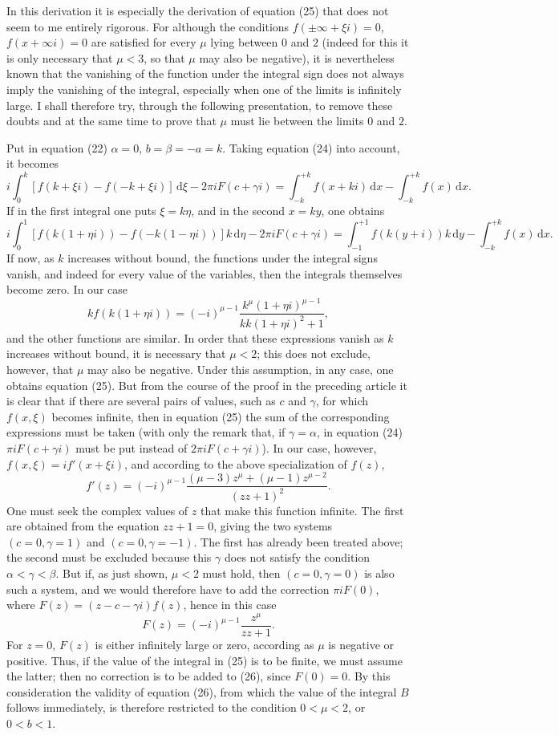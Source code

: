 \documentclass[11pt]{article}
\newcommand{\dd}{\,\mathrm d}
\begin{document}
In this derivation it is especially the derivation of equation (25) that does not seem to me entirely rigorous. For although the conditions $f(\pm\infty+\xi i)=0$, $f(x+\infty i)=0$ are satisfied for every $\mu$ lying between $0$ and $2$ (indeed for this it is only necessary that $\mu<3$, so that $\mu$ may also be negative), it is nevertheless known that the vanishing of the function under the integral sign does not always imply the vanishing of the integral, especially when one of the limits is infinitely large. I shall therefore try, through the following presentation, to remove these doubts and at the same time to prove that $\mu$ must lie between the limits $0$ and $2$.

Put in equation (22) $\alpha=0$, $b=\beta=-a=k$. Taking equation (24) into account, it becomes
\[
i\int_0^k [f(k+\xi i)-f(-k+\xi i)]\dd\xi-2\pi i F(c+\gamma i)
=\int_{-k}^{+k} f(x+ki)\dd x-\int_{-k}^{+k} f(x)\dd x.
\]
If in the first integral one puts $\xi=k\eta$, and in the second $x=ky$, one obtains
\[
i\int_0^1 [f(k(1+\eta i))-f(-k(1-\eta i))]k\dd\eta-2\pi iF(c+\gamma i)
=\int_{-1}^{+1}f(k(y+i))k\dd y-\int_{-k}^{+k}f(x)\dd x.
\]
If now, as $k$ increases without bound, the functions under the integral signs vanish, and indeed for every value of the variables, then the integrals themselves become zero. In our case
\[
kf(k(1+\eta i))=(-i)^{\mu-1}\frac{k^\mu(1+\eta i)^{\mu-1}}{kk(1+\eta i)^2+1},
\]
and the other functions are similar. In order that these expressions vanish as $k$ increases without bound, it is necessary that $\mu<2$; this does not exclude, however, that $\mu$ may also be negative. Under this assumption, in any case, one obtains equation (25). But from the course of the proof in the preceding article it is clear that if there are several pairs of values, such as $c$ and $\gamma$, for which $f(x,\xi)$ becomes infinite, then in equation (25) the sum of the corresponding expressions must be taken (with only the remark that, if $\gamma=\alpha$, in equation (24) $\pi iF(c+\gamma i)$ must be put instead of $2\pi iF(c+\gamma i)$). In our case, however, $f(x,\xi)=i f'(x+\xi i)$, and according to the above specialization of $f(z)$,
\[
f'(z)=(-i)^{\mu-1}\frac{(\mu-3)z^\mu+(\mu-1)z^{\mu-2}}{(zz+1)^2}.
\]
One must seek the complex values of $z$ that make this function infinite. The first are obtained from the equation $zz+1=0$, giving the two systems $(c=0,\gamma=1)$ and $(c=0,\gamma=-1)$. The first has already been treated above; the second must be excluded because this $\gamma$ does not satisfy the condition $\alpha<\gamma<\beta$. But if, as just shown, $\mu<2$ must hold, then $(c=0,\gamma=0)$ is also such a system, and we would therefore have to add the correction $\pi iF(0)$, where $F(z)=(z-c-\gamma i)f(z)$, hence in this case
\[
F(z)=(-i)^{\mu-1}\frac{z^\mu}{zz+1}.
\]
For $z=0$, $F(z)$ is either infinitely large or zero, according as $\mu$ is negative or positive. Thus, if the value of the integral in (25) is to be finite, we must assume the latter; then no correction is to be added to (26), since $F(0)=0$. By this consideration the validity of equation (26), from which the value of the integral $B$ follows immediately, is therefore restricted to the condition $0<\mu<2$, or $0<b<1$.
\end{document}
